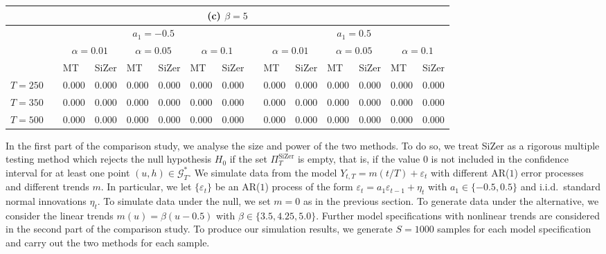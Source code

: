 \begin{table}[t!]
{\begin{tabularx}{\textwidth}{C{2} C{0.0001} ZZZZZZ C{0.0001} ZZZZZZ} 
 \\[0.2cm]
\toprule
        & &  & &  \\ 
 
        & &  &   &  
        & &  &   &  \\[0.1cm]
        & & MT & SiZer & MT & SiZer & MT & SiZer & & MT & SiZer & MT & SiZer & MT & SiZer \\
$T=250$ & & 0.000 & 0.000 & 0.000 & 0.000 & 0.000 & 0.000 & & 0.000 & 0.000 & 0.000 & 0.000 & 0.000 & 0.000 \\
$T=350$ & & 0.000 & 0.000 & 0.000 & 0.000 & 0.000 & 0.000 & & 0.000 & 0.000 & 0.000 & 0.000 & 0.000 & 0.000 \\ 
$T=500$ & & 0.000 & 0.000 & 0.000 & 0.000 & 0.000 & 0.000 & & 0.000 & 0.000 & 0.000 & 0.000 & 0.000 & 0.000 \\  
\bottomrule
\end{tabularx}
}
\end{table}


In the first part of the comparison study, we analyse the size and power of the two methods. To do so, we treat SiZer as a rigorous multiple testing method which rejects the null hypothesis $H_0$ if the set $\Pi_T^{\text{SiZer}}$ is empty, that is, if the value $0$ is not included in the confidence interval for at least one point $(u,h) \in \mathcal{G}_T^*$. We simulate data from the model $Y_{t,T} = m(t/T) + \varepsilon_t$ with different AR($1$) error processes and different trends $m$. In particular, we let $\{\varepsilon_t\}$ be an AR($1$) process of the form $\varepsilon_t = a_1 \varepsilon_{t-1} + \eta_t$ with $a_1 \in \{ -0.5,0.5\}$ and i.i.d.\ standard normal innovations $\eta_t$. To simulate data under the null, we set $m = 0$ as in the previous section. To generate data under the alternative, we consider the linear trends $m(u) = \beta (u - 0.5)$ with $\beta \in \{ 3.5, 4.25, 5.0 \}$. Further model specifications with nonlinear trends are considered in the second part of the comparison study. To produce our simulation results, we generate $S=1000$ samples for each model specification and carry out the two methods for each sample. 


